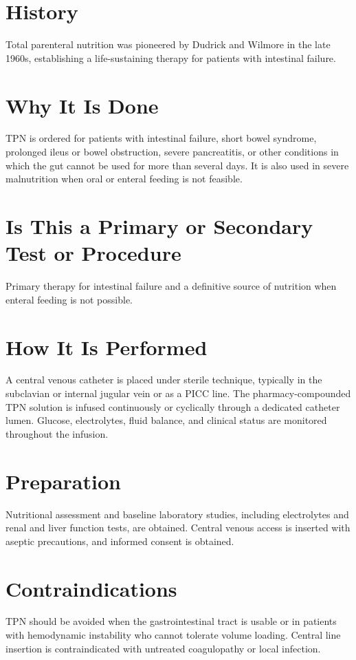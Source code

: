 \section*{History}
Total parenteral nutrition was pioneered by Dudrick and Wilmore in the late 1960s, establishing a life-sustaining therapy for patients with intestinal failure.

\section*{Why It Is Done}
TPN is ordered for patients with intestinal failure, short bowel syndrome, prolonged ileus or bowel obstruction, severe pancreatitis, or other conditions in which the gut cannot be used for more than several days. It is also used in severe malnutrition when oral or enteral feeding is not feasible.

\section*{Is This a Primary or Secondary Test or Procedure}
Primary therapy for intestinal failure and a definitive source of nutrition when enteral feeding is not possible.

\section*{How It Is Performed}
A central venous catheter is placed under sterile technique, typically in the subclavian or internal jugular vein or as a PICC line. The pharmacy-compounded TPN solution is infused continuously or cyclically through a dedicated catheter lumen. Glucose, electrolytes, fluid balance, and clinical status are monitored throughout the infusion.

\section*{Preparation}
Nutritional assessment and baseline laboratory studies, including electrolytes and renal and liver function tests, are obtained. Central venous access is inserted with aseptic precautions, and informed consent is obtained.

\section*{Contraindications}
TPN should be avoided when the gastrointestinal tract is usable or in patients with hemodynamic instability who cannot tolerate volume loading. Central line insertion is contraindicated with untreated coagulopathy or local infection.

